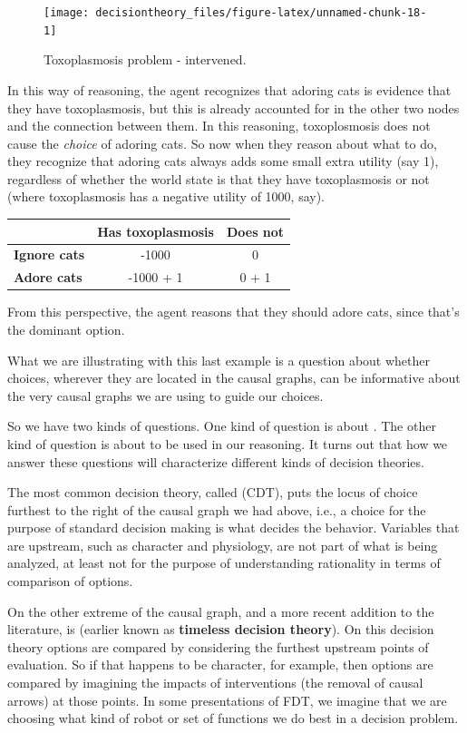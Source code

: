 \documentclass[]{tufte-book}
\begin{document}
\begin{figure}
\texttt{[image: decisiontheory\_files/figure-latex/unnamed-chunk-18-1]} \caption[Toxoplasmosis problem - intervened]{Toxoplasmosis problem - intervened.}\label{fig:unnamed-chunk-18}
\end{figure}

In this way of reasoning, the agent recognizes that adoring cats is evidence that they have toxoplasmosis, but this is already accounted for in the other two nodes and the connection between them. In this reasoning, toxoplosmosis does not cause the \emph{choice} of adoring cats. So now when they reason about what to do, they recognize that adoring cats always adds some small extra utility (say 1), regardless of whether the world state is that they have toxoplasmosis or not (where toxoplasmosis has a negative utility of 1000, say).

\begin{longtable}[]{@{}lcc@{}}
\toprule
& Has toxoplasmosis & Does not\tabularnewline
\midrule
\endhead
\textbf{Ignore cats} & -1000 & 0\tabularnewline
\textbf{Adore cats } & -1000 + 1 & 0 + 1\tabularnewline
\bottomrule
\end{longtable}

From this perspective, the agent reasons that they should adore cats, since that's the dominant option.

What we are illustrating with this last example is a question about whether choices, wherever they are located in the causal graphs, can be informative about the very causal graphs we are using to guide our choices.

So we have two kinds of questions. One kind of question is about . The other kind of question is about  to be used in our reasoning. It turns out that how we answer these questions will characterize different kinds of decision theories.

The most common decision theory, called  (CDT), puts the locus of choice furthest to the right of the causal graph we had above, i.e., a choice for the purpose of standard decision making is what decides the behavior. Variables that are upstream, such as character and physiology, are not part of what is being analyzed, at least not for the purpose of understanding rationality in terms of comparison of options.

On the other extreme of the causal graph, and a more recent addition to the literature, is  (earlier known as \textbf{timeless decision theory}). On this decision theory options are compared by considering the furthest upstream points of evaluation. So if that happens to be character, for example, then options are compared by imagining the impacts of interventions (the removal of causal arrows) at those points. In some presentations of FDT, we imagine that we are choosing what kind of robot or set of functions we do best in a decision problem.
\end{document}
